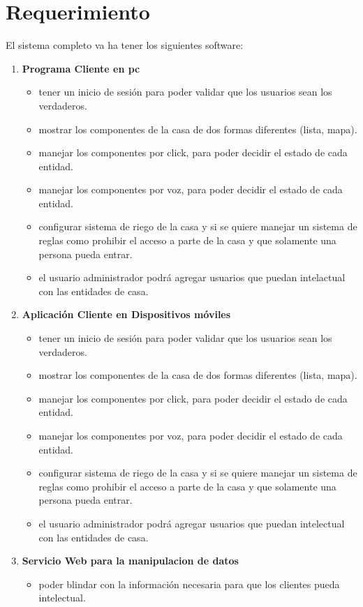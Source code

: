 \section{Requerimiento}
El sistema completo va ha tener los siguientes software:
\begin{enumerate}
\item \textbf{Programa Cliente en pc}
\begin{itemize}
\item tener un inicio de sesión para poder validar que los usuarios sean los verdaderos.
\item mostrar los componentes de la casa de dos formas diferentes (lista, mapa).
\item manejar los componentes por click, para poder decidir el estado de cada entidad.
\item manejar los componentes por voz, para poder decidir el estado de cada entidad.
\item configurar sistema de riego de la casa y si se quiere manejar un sistema de reglas como prohibir el acceso a parte de la casa y que solamente una persona pueda entrar.
\item el usuario administrador podrá agregar usuarios que puedan intelactual con las entidades de casa.
\end{itemize}
\item \textbf{Aplicación Cliente en Dispositivos móviles}
\begin{itemize}
\item tener un inicio de sesión para poder validar que los usuarios sean los verdaderos.
\item mostrar los componentes de la casa de dos formas diferentes (lista, mapa).
\item manejar los componentes por click, para poder decidir el estado de cada entidad.
\item manejar los componentes por voz, para poder decidir el estado de cada entidad.
\item configurar sistema de riego de la casa y si se quiere manejar un sistema de reglas como prohibir el acceso a parte de la casa y que solamente una persona pueda entrar.
\item el usuario administrador podrá agregar usuarios que puedan intelectual con las entidades de casa.
\end{itemize}
\newpage
\item \textbf{Servicio Web para la manipulacion de datos}
\begin{itemize}
\item poder blindar con la información necesaria para que los clientes pueda intelectual.

\end{itemize}
\end{enumerate}
